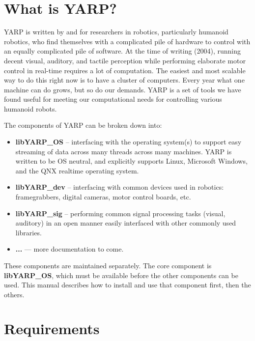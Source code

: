 
\section{What is YARP?}

YARP is written by and for researchers in robotics, particularly
humanoid robotics, who find themselves with a complicated pile of
hardware to control with an equally complicated pile of software.  At
the time of writing (2004), running decent visual, auditory, and
tactile perception while performing elaborate motor control in
real-time requires a lot of computation.  The easiest and most
scalable way to do this right now is to have a cluster of computers.
Every year what one machine can do grows, but so do our demands.  YARP
is a set of tools we have found useful for meeting our computational
needs for controlling various humanoid robots.

The components of YARP can be broken down into:

\begin{itemize}

\item {\bf libYARP\_OS} -- interfacing with the operating system(s)
to support easy streaming of data across many threads across many
machines.  YARP is written to be OS neutral, and explicitly supports
Linux, Microsoft Windows, and the QNX realtime operating system.

\item {\bf libYARP\_dev} -- interfacing with common devices used in robotics:
framegrabbers, digital cameras, motor control boards, etc.

\item {\bf libYARP\_sig} -- performing common signal processing tasks
(visual, auditory) in an open manner easily interfaced with other
commonly used libraries.

\item {\bf ...} --- more documentation to come.

\end{itemize}

These components are maintained separately.  The core component
is {\bf libYARP\_OS}, which must be available before the other 
components can be used.  This manual describes how to install and
use that component first, then the others.



\section{Requirements}

